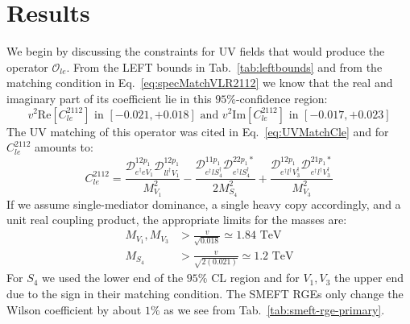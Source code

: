 \chapter{Results}
We begin by discussing the constraints for UV fields that would produce the operator $\mathcal{O}_{le}$. From the LEFT bounds in Tab.~\ref{tab:leftbounds} and from the matching condition in Eq.~\ref{eq:specMatchVLR2112} we know that the real and imaginary part of its coefficient lie in this $95\%$-confidence region:
\begin{equation}
    v^2\text{Re}[C_{le}^{2112}]\text{ in }[-0.021,+0.018]\text{ and } v^2\text{Im}[C_{le}^{2112}]\text{ in }[-0.017,+0.023]
\end{equation}
The UV matching of this operator was cited in Eq.~\ref{eq:UVMatchCle} and for $C_{le}^{2112}$ amounts to:
\begin{equation}
     C_{le}^{2112} =
     \frac{\mathcal{D}_{{e^\dagger eV_{1}}}^{{12p_1}} \mathcal{D}_{{ll^\dagger V_{1}}}^{{12p_1}}}{{M_{V_{1}}^2}}
    -\frac{\mathcal{D}_{{e^\dagger lS_{4}^\dagger }}^{{11p_1}} \mathcal{D}_{{e^\dagger lS_{4}^\dagger }}^{{22p_1*}}}{2 {M_{S_{4}}^2}}
    +\frac{\mathcal{D}_{{e^\dagger l^\dagger V_{3}^\dagger }}^{{12p_1}} \mathcal{D}_{{e^\dagger l^\dagger V_{3}^\dagger }}^{{21p_1*}}}{{M_{V_{3}}^2}}
\end{equation}
If we assume single-mediator dominance, a single heavy copy accordingly, and a unit real coupling product, the appropriate limits for the masses are:
\begin{align}
    M_{V_1},M_{V_3}&>\frac{v}{\sqrt{0.018}}\simeq1.84\text{ TeV}\\
    M_{S_4}&>\frac{v}{\sqrt{2(0.021)}}\simeq1.2\text{ TeV}
\end{align}
For $S_4$ we used the lower end of the $95\%$ CL region and for $V_1,V_3$ the upper end due to the sign in their matching condition. The SMEFT RGEs only change the Wilson coefficient by about $1\%$ as we see from Tab.~\ref{tab:smeft-rge-primary}.
